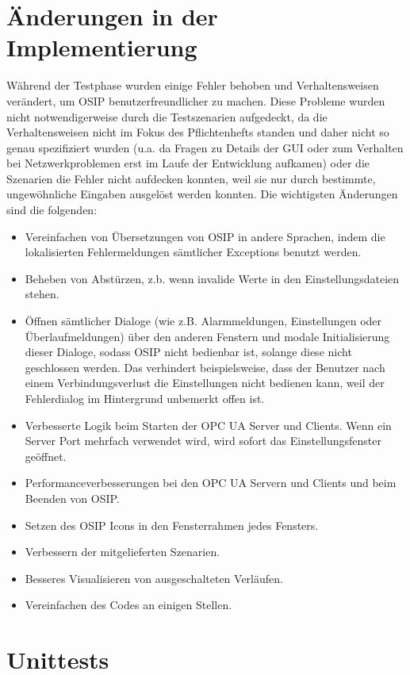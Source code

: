 \documentclass[parskip=full]{scrartcl}
\begin{document}
\section{Änderungen in der Implementierung}
Während der Testphase wurden einige Fehler behoben und Verhaltensweisen verändert, um OSIP benutzerfreundlicher zu machen.
Diese Probleme wurden nicht notwendigerweise durch die Testszenarien aufgedeckt, da die Verhaltensweisen nicht im Fokus des
Pflichtenhefts standen und daher nicht so genau spezifiziert wurden (u.a. da Fragen zu Details der GUI oder zum Verhalten bei Netzwerkproblemen
erst im Laufe der Entwicklung aufkamen) oder die Szenarien die Fehler nicht aufdecken konnten, weil sie nur durch bestimmte,
ungewöhnliche Eingaben ausgelöst werden konnten. Die wichtigsten Änderungen sind die folgenden:

\begin{itemize}
 \item Vereinfachen von Übersetzungen von OSIP in andere Sprachen, indem die lokalisierten Fehlermeldungen sämtlicher Exceptions benutzt werden.
 \item Beheben von Abstürzen, z.b. wenn invalide Werte in den Einstellungsdateien stehen.
 \item Öffnen sämtlicher Dialoge (wie z.B. Alarmmeldungen, Einstellungen oder Überlaufmeldungen) über den anderen Fenstern und modale Initialisierung dieser Dialoge,
 sodass OSIP nicht bedienbar ist, solange diese nicht geschlossen werden. Das verhindert beispielsweise, dass der Benutzer nach einem Verbindungsverlust
 die Einstellungen nicht bedienen kann, weil der Fehlerdialog im Hintergrund unbemerkt offen ist.
 \item Verbesserte Logik beim Starten der OPC UA Server und Clients. Wenn ein Server Port mehrfach verwendet wird, wird sofort das
 Einstellungsfenster geöffnet.
 \item Performanceverbesserungen bei den OPC UA Servern und Clients und beim Beenden von OSIP.
 \item Setzen des OSIP Icons in den Fensterrahmen jedes Fensters.
 \item Verbessern der mitgelieferten Szenarien.
 \item Besseres Visualisieren von ausgeschalteten Verläufen.
 \item Vereinfachen des Codes an einigen Stellen.
\end{itemize}

\section{Unittests}
\end{document}
